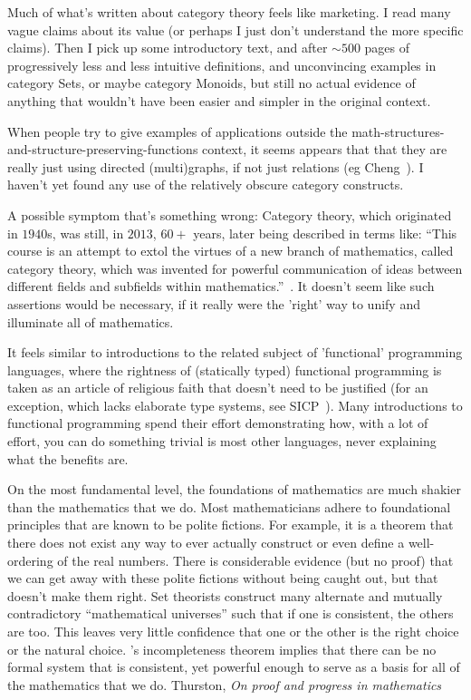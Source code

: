 \documentclass[11pt,openany]{book}
\begin{document}
Much of what's written about category theory feels like marketing.
I read many vague claims about its value
(or perhaps I just don't understand the more specific claims).
Then I pick up some introductory text,
and after ${\sim}500$ pages of progressively less and less 
intuitive definitions, and unconvincing examples in category Sets,
or maybe category Monoids,
but still no actual evidence of anything that wouldn't have been
easier and simpler in the original context.

When people try to give examples of applications outside the
math-structures-and-structure-preserving-functions context,
it seems appears that that  they are really just using directed
(multi)graphs, if not just relations (eg Cheng~\cite{cheng_2020_about}).
I haven't yet found any use of the relatively obscure category 
constructs.

A possible symptom that's something wrong:
Category theory, which originated in $1940$s,
was still, in $2013$, $60+$ years, later being described in terms like:
``This course is an attempt to extol the virtues of a new branch of mathematics,
called category theory, which was invented for powerful communication of ideas between
different fields and subfields within mathematics.''~\cite{spivakd_2013_cath_for_scientists}.
It doesn't seem like such assertions would be necessary,
if it really were the 'right' way to unify 
and illuminate all of mathematics.

It feels similar to introductions to the related subject of
'functional' programming languages,
where the rightness of (statically typed) functional programming 
is taken as
an article of religious faith that doesn't need to be justified
(for an exception, which lacks elaborate type systems,
see SICP~\cite{abelson1996sicp}).
Many introductions to functional programming spend their
effort demonstrating how, with a lot of effort, you can do
something trivial is most other languages,
never explaining what the benefits are.

\label{sec:Shaky-foundations}

\begin{boxquote}
On the most fundamental level, the foundations of mathematics are much shakier
than the mathematics that we do. Most mathematicians adhere to foundational
principles that are known to be polite fictions. For example, it is a theorem that
there does not exist any way to ever actually construct or even define a well-ordering
of the real numbers. There is considerable evidence (but no proof) that we can get
away with these polite fictions without being caught out, but that doesn’t make
them right. Set theorists construct many alternate and mutually contradictory
``mathematical universes'' such that if one is consistent, the others are too. This
leaves very little confidence that one or the other is the right choice or the natural
choice. {\Godel}’s incompleteness theorem implies that there can be no formal system
that is consistent, yet powerful enough to serve as a basis for all of the mathematics
that we do.
\tcblower
{Thurston, \textit{On proof and progress in mathematics}~\cite{thurston_1994_proof}}
\end{boxquote}
\end{document}
